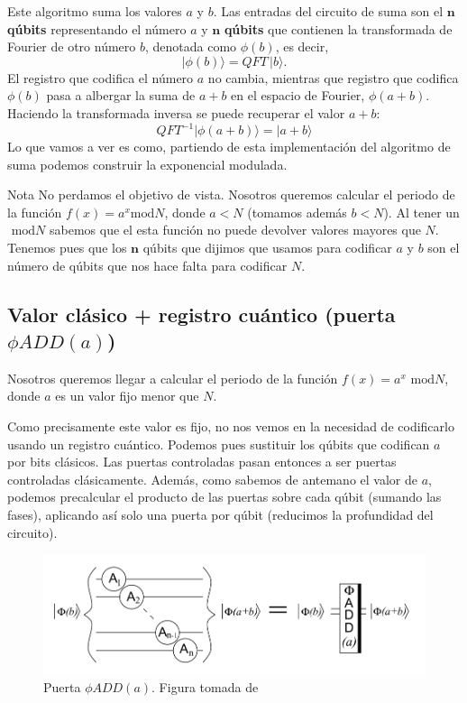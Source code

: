 \documentclass[a4paper,11pt]{book} %
\numberwithin{equation}{chapter}
\begin{document}
Este algoritmo suma los valores $a$ y $b$. Las entradas del circuito de suma son el $\bm{n}$ \textbf{qúbits} representando el número $a$ y $\bm{n}$ \textbf{qúbits} que contienen la transformada de Fourier de otro número $b$, denotada como $\phi(b)$, es decir,
	\begin{equation}
 	|\phi (b) \rangle = QFT \, |b \rangle.
 	\end{equation} 
El registro que codifica el número $a$ no cambia, mientras que registro que codifica $\phi (b)$ pasa a albergar la suma de $a+b$ en el espacio de Fourier, $\phi (a+b)$. Haciendo la transformada inversa se puede recuperar el valor $a+b$:
	\begin{equation}
	QFT^{-1}| \phi (a+b) \rangle = | a+b \rangle
	\end{equation}
Lo que vamos a ver es como, partiendo de esta implementación del algoritmo de suma podemos construir la exponencial modulada.

\begin{mybox_blue}{Nota}
No perdamos el objetivo de vista. Nosotros queremos calcular el periodo de la función $f(x) = a^x \text{mod}N$, donde $a<N$ (tomamos además $b<N$). Al tener un $\text{ mod}N$ sabemos que el esta función no puede devolver valores mayores que $N$. Tenemos pues que los $\boldsymbol{n}$ qúbits que dijimos que usamos para codificar $a$ y $b$ son el número de qúbits que nos hace falta para codificar $N$.
\end{mybox_blue}

\subsection{Valor clásico + registro cuántico (puerta $\phi ADD(a)$)} \label{sec_2n+3-Puerta-phiADD(a)}

Nosotros queremos llegar a calcular el periodo de la función $f(x) = a^x \text{ mod}N$, donde $a$ es un valor fijo menor que $N$. 

Como precisamente este valor es fijo, no nos vemos en la necesidad de codificarlo usando un registro cuántico. Podemos pues sustituir los qúbits que codifican $a$ por bits clásicos. Las puertas controladas pasan entonces a ser puertas controladas clásicamente. Además, como sabemos de antemano el valor de $a$, podemos precalcular el producto de las puertas sobre cada qúbit (sumando las fases), aplicando así solo una puerta por qúbit (reducimos la profundidad del circuito).

\begin{figure}[t]
\centering 
\includegraphics[width=0.7\linewidth]{Figuras/Fig-phiADD(a).png}
\caption{Puerta $\phi ADD(a)$. Figura tomada de \cite{bib_2n+3}}
\label{Fig_idea_puerta_phiADD(a)}
\end{figure}
\end{document}
